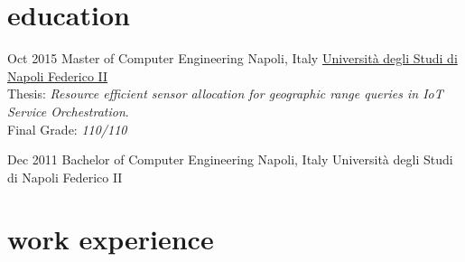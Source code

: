 \vspace{-0.3cm}
\section{\normalfont education}

\begin{entrylist}
\entry
{Oct 2015}
{Master {\normalfont of Computer Engineering}}
{Napoli, Italy}
{\href{http://www.unina.it/home}{Università degli Studi di Napoli Federico II}}\\
Thesis: \emph{Resource efficient sensor allocation for geographic range queries in IoT Service Orchestration}.\\
Final Grade: \emph{110/110}
\vspace{-.2cm}

\entry
{Dec 2011}
{Bachelor {\normalfont of Computer Engineering}}
{Napoli, Italy}
{Università degli Studi di Napoli Federico II}\\

\end{entrylist}

\vspace{-.4cm}
\section{\normalfont work experience}


